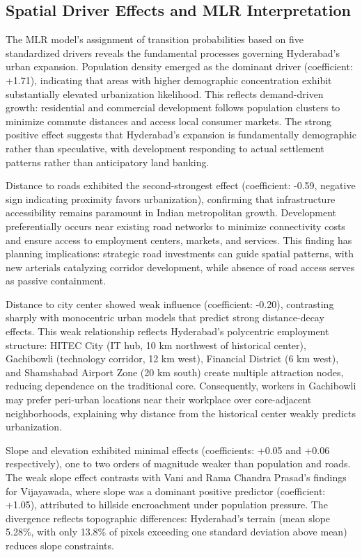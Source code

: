 \documentclass[conference]{IEEEtran}
\begin{document}
\subsection{Spatial Driver Effects and MLR Interpretation}

The MLR model's assignment of transition probabilities based on five standardized drivers reveals the fundamental processes governing Hyderabad's urban expansion. Population density emerged as the dominant driver (coefficient: +1.71), indicating that areas with higher demographic concentration exhibit substantially elevated urbanization likelihood. This reflects demand-driven growth: residential and commercial development follows population clusters to minimize commute distances and access local consumer markets. The strong positive effect suggests that Hyderabad's expansion is fundamentally demographic rather than speculative, with development responding to actual settlement patterns rather than anticipatory land banking.

Distance to roads exhibited the second-strongest effect (coefficient: -0.59, negative sign indicating proximity favors urbanization), confirming that infrastructure accessibility remains paramount in Indian metropolitan growth. Development preferentially occurs near existing road networks to minimize connectivity costs and ensure access to employment centers, markets, and services. This finding has planning implications: strategic road investments can guide spatial patterns, with new arterials catalyzing corridor development, while absence of road access serves as passive containment.

Distance to city center showed weak influence (coefficient: -0.20), contrasting sharply with monocentric urban models that predict strong distance-decay effects. This weak relationship reflects Hyderabad's polycentric employment structure: HITEC City (IT hub, 10 km northwest of historical center), Gachibowli (technology corridor, 12 km west), Financial District (6 km west), and Shamshabad Airport Zone (20 km south) create multiple attraction nodes, reducing dependence on the traditional core. Consequently, workers in Gachibowli may prefer peri-urban locations near their workplace over core-adjacent neighborhoods, explaining why distance from the historical center weakly predicts urbanization.

Slope and elevation exhibited minimal effects (coefficients: +0.05 and +0.06 respectively), one to two orders of magnitude weaker than population and roads. The weak slope effect contrasts with Vani and Rama Chandra Prasad's \cite{vani2022} findings for Vijayawada, where slope was a dominant positive predictor (coefficient: +1.05), attributed to hillside encroachment under population pressure. The divergence reflects topographic differences: Hyderabad's terrain (mean slope 5.28\%, with only 13.8\% of pixels exceeding one standard deviation above mean) reduces slope constraints.
\end{document}
